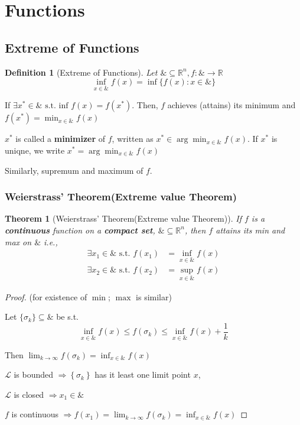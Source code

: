 \documentclass[11pt,a4paper]{article}
\newtheorem{theorem}{Theorem}
\newtheorem{definition}{Definition}
\begin{document}
\section{Functions}
\subsection{Extreme of Functions}
\begin{definition}[Extreme of Functions]
    Let $\& \subseteq \mathbb{R}^{n}, f: \& \rightarrow \mathbb{R}$
    $$\inf_{x \in \&} f(x)=\inf\{f(x): x \in \&\}$$
\end{definition}

If $\exists x^{*} \in \& \text { s.t. inf } f(x)=f\left(x^{*}\right)$. Then, $f$ achieves (attains) its minimum and $f\left(x^{*}\right)=\min _{x \in \&} f(x)$

$x^{*}$ is called a \textbf{minimizer} of $f$, written as $x^{*} \in \arg \min _{x \in \&} f(x)$. If $x^*$ is uniqne, we write $x^{*}=\arg \min _{x \in \&} f(x)
$

Similarly, supremum and maximum of $f$.

\subsubsection{Weierstrass' Theorem(Extreme value Theorem)}
\begin{theorem}
    [Weierstrass' Theorem(Extreme value Theorem)]
    \quad

    If $f$ is a \textbf{continuous} function on a \textbf{compact set}, $\& \subseteq \mathbb{R}^{n}$, then $f$ attains its min and max on $\&$ i.e.,
    $$
    \begin{aligned}
    \exists x_1 \in \& \text { s.t. } f\left(x_{1}\right) &=\inf _{x \in \&} f(x) \\
    \exists x_{2} \in \& \text { s.t. } f\left(x_{2}\right) &=\sup _{x \in \&} f(x)
    \end{aligned}
    $$
\end{theorem}
\begin{proof}
    (for existence of $\min$; $\max$ is similar)

    Let $\{\sigma_k\}\subseteq \&$ be s.t.
    $$\inf_{x\in\&} f(x) \leq f\left(\sigma_{k}\right) \leq \inf _{x \in \&} f(x)+\frac{1}{k}$$

    Then $\lim _{k \rightarrow \infty} f\left(\sigma_{k}\right)=\inf_{x\in\&} f(x)$

    $\mathcal{L}$ is bounded $\Rightarrow\left\{\sigma_{k}\right\}$ has it least one limit point $x$,

    $\mathcal{L}$ is closed $\Rightarrow x_{1} \in \&$

    $f$ is continuous $\Rightarrow f\left(x_{1}\right)=\lim _{k \rightarrow \infty} f\left(\sigma_{k}\right)=\inf _{x \in \&} f(x)$
\end{proof}
\end{document}
